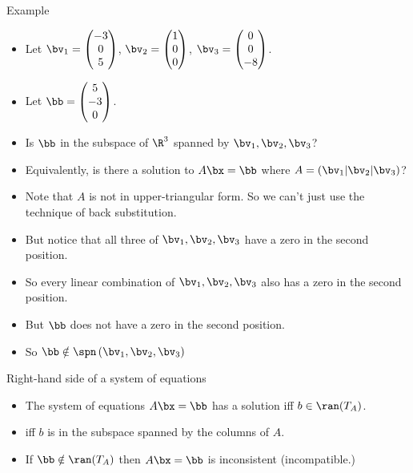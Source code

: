 \documentclass[handout]{beamer}
\begin{document}
\begin{frame}{Example}

\begin{itemize}
\item Let
$\bv_1 =
\begin{pmatrix}
-3 \\ 0 \\ 5
\end{pmatrix}
$,
$\bv_2 =
\begin{pmatrix}
1 \\ 0 \\ 0
\end{pmatrix}
$,
$\bv_3 =
\begin{pmatrix}
0 \\ 0 \\ -8
\end{pmatrix}
$.
\item Let
$\bb=
\begin{pmatrix}
5 \\ -3 \\0
\end{pmatrix}
$.
\item Is $\bb$ in the subspace of $\R^3$ spanned by $\bv_1,\bv_2,\bv_3$?
\item Equivalently, is there a solution to $A\bx=\bb$ where
$A= \left(\bv_1 \vert \bv_2 \vert \bv_3 \right)$?
\item Note that $A$ is not in upper-triangular form. So we can't just use the technique of back substitution.
\item But notice that all three of $\bv_1,\bv_2,\bv_3$ have a zero in the
second position.
\item So every linear combination of $\bv_1,\bv_2,\bv_3$ also has a zero in the
second position.
\item But $\bb$ does not have a zero in the second position.
\item So $\bb\notin\spn\left( \bv_1,\bv_2,\bv_3\right)$

\end{itemize}

\end{frame}


\begin{frame}{Right-hand side of a system of equations}

\begin{itemize}
\item The system of equations $A\bx=\bb$ has a solution iff $b\in\ran(T_A)$.
\item iff $b$ is in the subspace spanned by the columns of $A$.
\item If $\bb\notin\ran(T_A)$ then $A\bx=\bb$ is inconsistent (incompatible.)
\end{itemize}

\end{frame}
\end{document}
